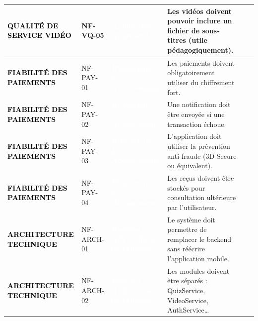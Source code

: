 \begin{longtable}{|P{2.15cm}|P{1.55cm}|P{2.35cm}|P{5.60cm}|P{1.65cm}|P{1.45cm}|}
\textcolor{black}{\textbf{QUALITÉ DE SERVICE VIDÉO}} & NF-VQ-05 & \textcolor{white}{\textbf{Application Apprenant}} & Les vidéos doivent pouvoir inclure un fichier de sous-titres (utile pédagogiquement). &  &  \\ \hline
{}
\textcolor{black}{\textbf{FIABILITÉ DES PAIEMENTS}} & NF-PAY-01 & \textcolor{white}{\textbf{Utilisateurs \& Abonnements}} & Les paiements doivent obligatoirement utiliser du chiffrement fort. &  &  \\ \hline
{}
\textcolor{black}{\textbf{FIABILITÉ DES PAIEMENTS}} & NF-PAY-02 & \textcolor{white}{\textbf{Utilisateurs \& Abonnements}} & Une notification doit être envoyée si une transaction échoue. &  &  \\ \hline
{}
\textcolor{black}{\textbf{FIABILITÉ DES PAIEMENTS}} & NF-PAY-03 & \textcolor{white}{\textbf{Utilisateurs \& Abonnements}} & L’application doit utiliser la prévention anti-fraude (3D Secure ou équivalent). &  &  \\ \hline
{}
\textcolor{black}{\textbf{FIABILITÉ DES PAIEMENTS}} & NF-PAY-04 & \textcolor{white}{\textbf{Utilisateurs \& Abonnements}} & Les reçus doivent être stockés pour consultation ultérieure par l’utilisateur. &  &  \\ \hline
{}
\textcolor{black}{\textbf{ARCHITECTURE TECHNIQUE}} & NF-ARCH-01 & \textcolor{white}{\textbf{Backend / API \& Base de Données}} & Le système doit permettre de remplacer le backend sans réécrire l’application mobile. &  &  \\ \hline
{}
\textcolor{black}{\textbf{ARCHITECTURE TECHNIQUE}} & NF-ARCH-02 & \textcolor{white}{\textbf{Backend / API \& Base de Données}} & Les modules doivent être séparés : QuizService, VideoService, AuthService… &  &  \\ \hline

\end{longtable}
